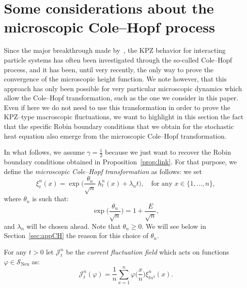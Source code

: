 \documentclass[AHL,Unicode,longabstracts]{cedram}
\DeclareMathOperator{\Neu}{Neu}
\newcommand{\mc}[1]{{\mathcal #1}}
\renewcommand{\mc}[1]{{\mathcal #1}}
\newcommand{\SN}{\ensuremath{\mc S_{\Neu}}}
\renewcommand{\ge}{\geqslant}
\renewcommand{\tfrac}{\frac}
\begin{document}
\section{Some considerations about the microscopic Cole--Hopf process}\label{app:micro-CH}

Since the major breakthrough made by~\cite{BerG}, the KPZ behavior for interacting particle systems has often been investigated through the so-called Cole--Hopf process, and it has been, until very recently, the only way to prove the convergence of the microscopic height function. We note however, that this approach has only been possible for very particular microscopic dynamics which allow the Cole--Hopf transformation, such as the one we consider in this paper. Even if here we do not need to use this transformation in order to prove the KPZ--type macroscopic fluctuations, we want to highlight in this section the fact that the specific Robin boundary conditions that we obtain for the stochastic heat equation also emerge from the microscopic Cole--Hopf transformation.

In what follows, we assume $\gamma=\tfrac12$ because we just want to recover the Robin boundary conditions obtained in Proposition~\ref{prop:link}. For that purpose, we define the \emph{microscopic Cole--Hopf transformation} as follows: we set
\begin{equation}\label{eq:xitn}
\xi_t^n(x) = \exp\bigg(\tfrac{\theta_n}{\sqrt n} \; h_t^n(x)+\lambda_n t\bigg), \quad \text{for any } x \in \{1,\dots,n\},
\end{equation}
where $\theta_n$ is such that:
\begin{equation}\label{eq:gammalambda}
\exp\bigg(\tfrac{\theta_n}{\sqrt n}\bigg) = 1+ \tfrac{E}{\sqrt n},
\end{equation}
and $\lambda_n$ will be chosen ahead. Note that $\theta_n\ge 0$. We will see below in Section~\ref{sec:appCH} the reason for this choice of $\theta_n$.

\begin{defi}\label{def:current}
For any $t>0$ let $\mc J_t^n$ be the \emph{current fluctuation field} which acts on functions $\varphi \in \SN$ as:
\[
\mc J_t^n(\varphi)=\frac{1}{n} \sum_{x=1}^n \varphi\Big(\tfrac x n \Big) \xi_{tn^2}^n(x).
\]
\end{defi}
\end{document}

